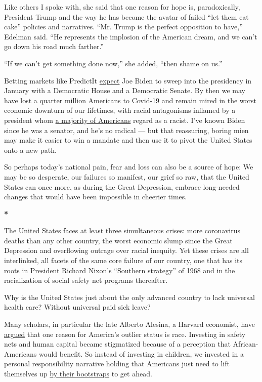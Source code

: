 Like others I spoke with, she said that one reason for hope is,
paradoxically, President Trump and the way he has become the avatar of
failed ``let them eat cake'' policies and narratives. ``Mr. Trump is the
perfect opposition to have,'' Edelman said. ``He represents the
implosion of the American dream, and we can't go down his road much
farther.''

``If we can't get something done now,'' she added, ``then shame on us.''

Betting markets like PredictIt
\href{https://www.predictit.org/markets/2/Congress}{expect} Joe Biden to
sweep into the presidency in January with a Democratic House and a
Democratic Senate. By then we may have lost a quarter million Americans
to Covid-19 and remain mired in the worst economic downturn of our
lifetimes, with racial antagonisms inflamed by a president whom
\href{https://news.yahoo.com/new-yahoo-news-you-gov-poll-most-americans-say-trump-is-a-racist-and-want-him-to-stop-tweeting-160841770.html}{a
majority of Americans} regard as a racist. I've known Biden since he was
a senator, and he's no radical --- but that reassuring, boring mien may
make it easier to win a mandate and then use it to pivot the United
States onto a new path.

So perhaps today's national pain, fear and loss can also be a source of
hope: We may be so desperate, our failures so manifest, our grief so
raw, that the United States can once more, as during the Great
Depression, embrace long-needed changes that would have been impossible
in cheerier times.

\textbf{*}

The United States faces at least three simultaneous crises: more
coronavirus deaths than any other country, the worst economic slump
since the Great Depression and overflowing outrage over racial inequity.
Yet these crises are all interlinked, all facets of the same core
failure of our country, one that has its roots in President Richard
Nixon's ``Southern strategy'' of 1968 and in the racialization of social
safety net programs thereafter.

Why is the United States just about the only advanced country to lack
universal health care? Without universal paid sick leave?

Many scholars, in particular the late Alberto Alesina, a Harvard
economist, have
\href{https://scholar.harvard.edu/files/glaeser/files/why_doesnt_the_u.s._have_a_european-style_welfare_state.pdf}{argued}
that one reason for America's outlier status is race. Investing in
safety nets and human capital became stigmatized because of a perception
that African-Americans would benefit. So instead of investing in
children, we invested in a personal responsibility narrative holding
that Americans just need to lift themselves up
\href{https://www.nytimes3xbfgragh.onion/2020/02/19/opinion/economic-mobility.html}{by
their bootstraps} to get ahead.

